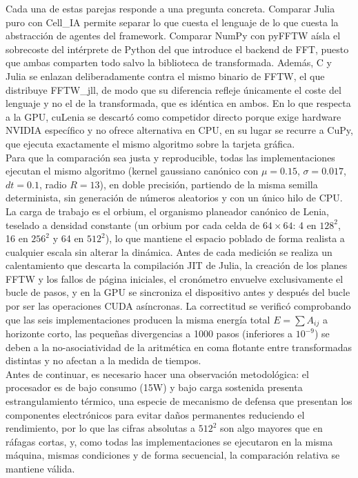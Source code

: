 \documentclass[runningheads]{llncs}
\begin{document}
Cada una de estas parejas responde a una pregunta concreta. Comparar Julia puro con Cell\_IA permite separar lo que cuesta el lenguaje de lo que cuesta la abstracción de agentes del framework. Comparar NumPy con pyFFTW aísla el sobrecoste del intérprete de Python del que introduce el backend de FFT, puesto que ambas comparten todo salvo la biblioteca de transformada. Además, C y Julia se enlazan deliberadamente contra el mismo binario de FFTW, el que distribuye FFTW\_jll, de modo que su diferencia refleje únicamente el coste del lenguaje y no el de la transformada, que es idéntica en ambos. En lo que respecta a la GPU, cuLenia se descartó como competidor directo porque exige hardware NVIDIA específico y no ofrece alternativa en CPU, en su lugar se recurre a CuPy, que ejecuta exactamente el mismo algoritmo sobre la tarjeta gráfica.\\

Para que la comparación sea justa y reproducible, todas las implementaciones ejecutan el mismo algoritmo (kernel gaussiano canónico con $\mu=0.15$, $\sigma=0.017$, $dt=0.1$, radio $R=13$), en doble precisión, partiendo de la misma semilla determinista, sin generación de números aleatorios y con un único hilo de CPU. La carga de trabajo es el orbium, el organismo planeador canónico de Lenia, teselado a densidad constante (un orbium por cada celda de $64\times64$: 4 en $128^2$, 16 en $256^2$ y 64 en $512^2$), lo que mantiene el espacio poblado de forma realista a cualquier escala sin alterar la dinámica. Antes de cada medición se realiza un calentamiento que descarta la compilación JIT de Julia, la creación de los planes FFTW y los fallos de página iniciales, el cronómetro envuelve exclusivamente el bucle de pasos, y en la GPU se sincroniza el dispositivo antes y después del bucle por ser las operaciones CUDA asíncronas. La correctitud se verificó comprobando que las seis implementaciones producen la misma energía total $E=\sum A_{ij}$ a horizonte corto, las pequeñas divergencias a 1000 pasos (inferiores a $10^{-9}$) se deben a la no-asociatividad de la aritmética en coma flotante entre transformadas distintas y no afectan a la medida de tiempos.\\

Antes de continuar, es necesario hacer una observación metodológica: el procesador es de bajo consumo (15W) y bajo carga sostenida presenta estrangulamiento térmico, una especie de mecanismo de defensa que presentan los componentes electrónicos para evitar daños permanentes reduciendo el rendimiento, por lo que las cifras absolutas a $512^2$ son algo mayores que en ráfagas cortas, y, como todas las implementaciones se ejecutaron en la misma máquina, mismas condiciones y de forma secuencial, la comparación relativa se mantiene válida.
\end{document}
